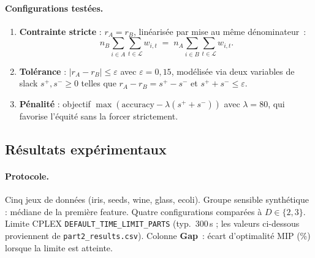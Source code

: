 \documentclass[a4paper,10pt,titlepage,leqno]{article}
\begin{document}
\paragraph{Configurations testées.}

\begin{enumerate}
  \item \textbf{Contrainte stricte} : $r_A = r_B$, linéarisée par mise au même dénominateur~:
  \begin{equation}
    n_B \sum_{i \in A} \sum_{t \in \mathcal{L}} w_{i,t} \;=\; n_A \sum_{i \in B} \sum_{t \in \mathcal{L}} w_{i,t}.
    \label{eq:constraint}
  \end{equation}
  \item \textbf{Tolérance} : $|r_A - r_B| \leq \varepsilon$ avec $\varepsilon = 0{,}15$, modélisée via deux variables de slack $s^+, s^- \geq 0$ telles que $r_A - r_B = s^+ - s^-$ et $s^+ + s^- \leq \varepsilon$.
  \item \textbf{Pénalité} : objectif $\max(\text{accuracy} - \lambda (s^+ + s^-))$ avec $\lambda = 80$, qui favorise l'équité sans la forcer strictement.
\end{enumerate}

\subsection{Résultats expérimentaux}

\paragraph{Protocole.} Cinq jeux de données (iris, seeds, wine, glass, ecoli). Groupe sensible synthétique : médiane de la première feature. Quatre configurations comparées à $D \in \{2,3\}$. Limite CPLEX \texttt{DEFAULT\_TIME\_LIMIT\_PARTS} (typ.\ 300\,s ; les valeurs ci-dessous proviennent de \texttt{part2\_results.csv}). Colonne \textbf{Gap}~: écart d'optimalité MIP (\%) lorsque la limite est atteinte.
\end{document}

